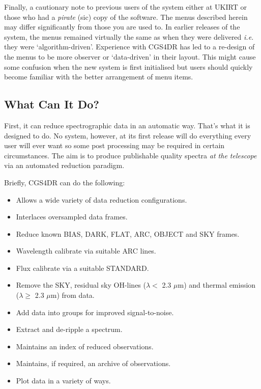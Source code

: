{Finally, a cautionary note to previous users of the system either at UKIRT or
those who had a {\em pirate} (sic) copy of the software. The menus described 
herein may differ significantly from those you are used to. 
In earlier releases of the system, the menus remained virtually the same as 
when they were delivered {\em i.e.} they were `algorithm-driven'. Experience 
with CGS4DR has led to a re-design of the menus to be more observer or 
`data-driven' in their layout. This might cause some confusion when the 
new system is first initialised but users should quickly become familiar with 
the better arrangement of menu items.

\subsection{What Can It Do?}
\label{what_can_it_do}

First, it can reduce spectrographic data in an automatic way.
That's what it is designed to do. No system, however, at its first release 
will do everything every user will ever want so some post processing may be 
required in certain circumstances. The aim is to produce publishable quality 
spectra {\em at the telescope} via an automated reduction paradigm. 

Briefly, CGS4DR can do the following:

\begin{itemize}
\item Allows a wide variety of data reduction configurations.
\item Interlaces oversampled data frames.
\item Reduce known {\sf BIAS}, {\sf DARK}, {\sf FLAT}, {\sf ARC}, {\sf OBJECT} and {\sf SKY} frames.
\item Wavelength calibrate via suitable {\sf ARC} lines.
\item Flux calibrate via a suitable {\sf STANDARD}.
\item Remove the {\sf SKY}, residual sky OH-lines ($\lambda <$ 2.3 $\mu$m) 
  and thermal emission ($\lambda \geq$ 2.3 $\mu$m) from data. 
\item Add data into groups for improved signal-to-noise.
\item Extract and de-ripple a spectrum.
\item Maintains an index of reduced observations.
\item Maintains, if required, an archive of observations.
\item Plot data in a variety of ways.
\end{itemize}

}
